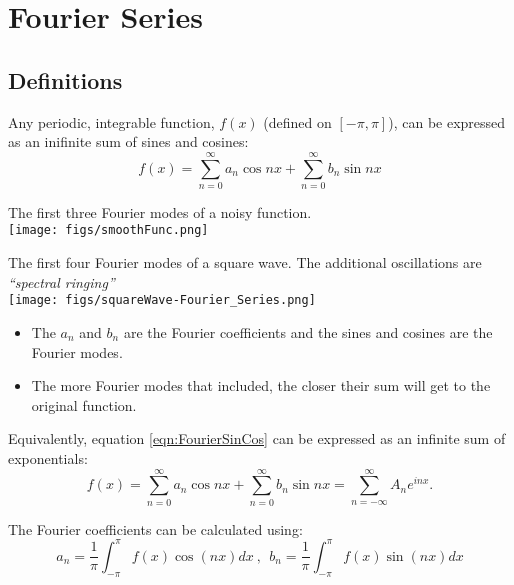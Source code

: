 \begin{minipage}{0.6\linewidth}
\chapter{Fourier Series}

\section{Definitions}

Any periodic, integrable function, $f(x)$ (defined on $[-\pi,\pi]$), can be expressed as an inifinite sum of sines and cosines:
\begin{equation}
f(x) = \sum_{n=0}^{\infty} a_n \cos nx + \sum_{n=0}^{\infty}b_n \sin nx
\label{eqn:FourierSinCos}
\end{equation}

The first three Fourier modes of a noisy function.\\
\texttt{[image: figs/smoothFunc.png]}
\end{minipage}
\hfill
\begin{minipage}{0.35\linewidth}
The first four Fourier modes of a square wave.  The additional oscillations are {\em``spectral ringing''} \\
\texttt{[image: figs/squareWave-Fourier\_Series.png]}
\end{minipage}

\begin{itemize}
\item The $a_n$ and $b_n$ are the Fourier coefficients and the sines and cosines are the Fourier modes.
\item The more Fourier modes that included, the closer their sum will get to the original function.
\end{itemize}

\clearpage

Equivalently, equation \ref{eqn:FourierSinCos} can be expressed as an infinite sum of exponentials:
\begin{equation}
f(x) = \sum_{n=0}^{\infty} a_n \cos nx + \sum_{n=0}^{\infty}b_n \sin nx
     = \sum_{n=-\infty}^{\infty} A_n e^{inx}.
\label{eqn:FourierExp}
\end{equation}

The Fourier coefficients can be calculated using:
\begin{equation*}
a_n = \frac{1}{\pi}\int_{-\pi}^{\pi}f(x)\cos(nx)dx ~, ~~
b_n = \frac{1}{\pi}\int_{-\pi}^{\pi}f(x)\sin(nx)dx
\end{equation*}

